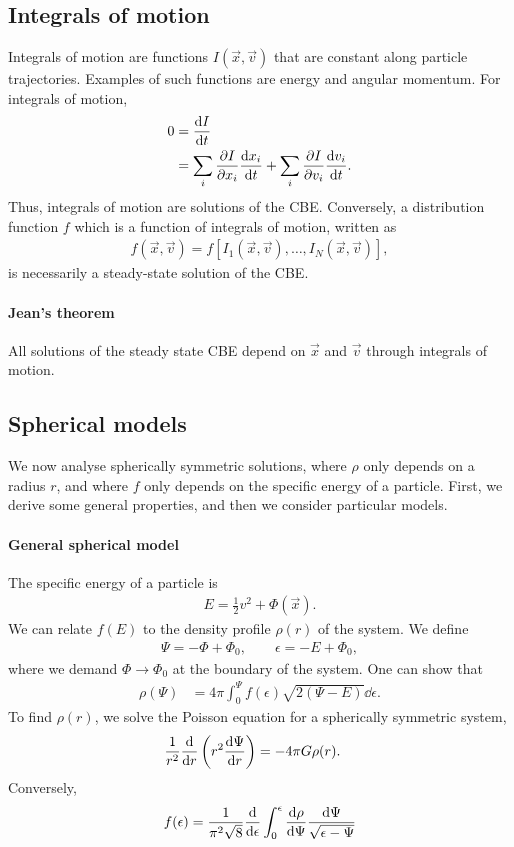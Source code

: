 \subsection{Integrals of motion}
Integrals of motion are functions $I(\vec{x}, \vec{v})$ that are constant along particle trajectories.
Examples of such functions are energy and angular momentum.
For integrals of motion,
\begin{align*}
	0 &= \dv{I}{t}\\
	&= \sum_{i} \pdv{I}{x_i} \dv{x_i}{t}
	+ \sum_{i} \pdv{I}{v_i} \dv{v_i}{t}.
\end{align*}
Thus, integrals of motion are solutions of the CBE.
Conversely, a distribution function $f$ which is a function of integrals of motion, written as
\begin{align*}
	f(\vec{x}, \vec{v}) = f[I_1(\vec{x}, \vec{v}), \dots, I_N(\vec{x}, \vec{v})],
\end{align*}
is necessarily a steady-state solution of the CBE.

\paragraph*{Jean's theorem}
All solutions of the steady state CBE depend on $\vec{x}$ and $\vec{v}$ through integrals of motion.

\subsection{Spherical models}
We now analyse spherically symmetric solutions, where $\rho$ only depends on a radius $r$, and where $f$ only depends on the specific energy of a particle.
First, we derive some general properties, and then we consider particular models.

\paragraph*{General spherical model}
The specific energy of a particle is
\begin{align*}
	E = \frac{1}{2} v^2 + \Phi(\vec{x}).
\end{align*}
We can relate $f(E)$ to the density profile $\rho(r)$ of the system. We define
\begin{align*}
	\Psi = - \Phi + \Phi_0, \qquad
	\epsilon = - E + \Phi_0,
\end{align*}
where we demand $\Phi \to \Phi_0$ at the boundary of the system. One can show that
\begin{align*}
	\rho(\Psi)
	&= 4 \pi \int_0^\Psi f(\epsilon) \sqrt{2(\Psi - E)} \dd{\epsilon}.
\end{align*}
To find $\rho(r)$, we solve the Poisson equation for a spherically symmetric system,
\begin{align*}
	\frac{1}{r^2} \dv{}{r} \left( r^2 \dv{\Psi}{r} \right)
	&= - 4 \pi G \rho(r).
\end{align*}
Conversely,
\begin{align*}
	f(\epsilon)
	= \frac{1}{\pi^2 \sqrt{8}}
	\dv{}{\epsilon}
	\int_0^\epsilon \dv{\rho}{\Psi} \frac{\dd{\Psi}}{\sqrt{\epsilon-\Psi}}
\end{align*}

